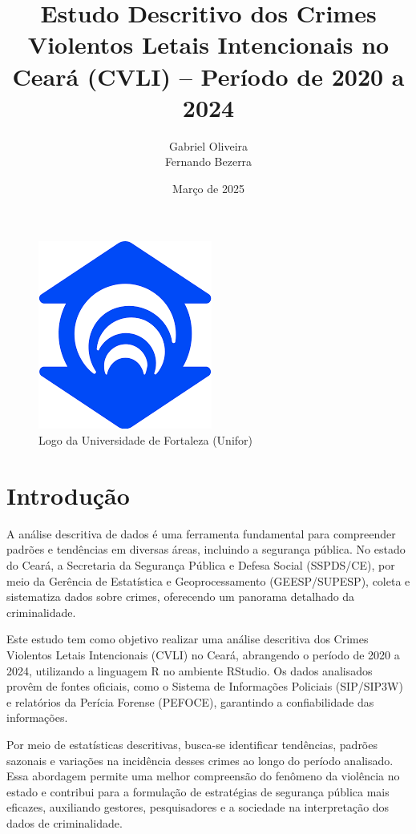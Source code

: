 \documentclass{exam}
\title{\Large Estudo Descritivo dos Crimes Violentos Letais Intencionais no Ceará (CVLI) -- Período de 2020 a 2024}
\author{Gabriel Oliveira \\ Fernando Bezerra}
\date{Março de 2025}
\begin{document}
\begin{figure}[t]
    \centering
    \includegraphics[scale=0.3]{uniforlogo.png}
    \caption{Logo da Universidade de Fortaleza (Unifor)}
    \label{fig:uniforlogo}
\end{figure}

\maketitle
\thispagestyle{empty}

\newpage

\renewcommand{\contentsname}{Sumário}
\tableofcontents
\newpage

\section{Introdução}
A análise descritiva de dados é uma ferramenta fundamental para compreender padrões e tendências em diversas áreas, incluindo a segurança pública. No estado do Ceará, a Secretaria da Segurança Pública e Defesa Social (SSPDS/CE), por meio da Gerência de Estatística e Geoprocessamento (GEESP/SUPESP), coleta e sistematiza dados sobre crimes, oferecendo um panorama detalhado da criminalidade.

Este estudo tem como objetivo realizar uma análise descritiva dos Crimes Violentos Letais Intencionais (CVLI) no Ceará, abrangendo o período de 2020 a 2024, utilizando a linguagem R no ambiente RStudio. Os dados analisados provêm de fontes oficiais, como o Sistema de Informações Policiais (SIP/SIP3W) e relatórios da Perícia Forense (PEFOCE), garantindo a confiabilidade das informações.

Por meio de estatísticas descritivas, busca-se identificar tendências, padrões sazonais e variações na incidência desses crimes ao longo do período analisado. Essa abordagem permite uma melhor compreensão do fenômeno da violência no estado e contribui para a formulação de estratégias de segurança pública mais eficazes, auxiliando gestores, pesquisadores e a sociedade na interpretação dos dados de criminalidade.
\end{document}
